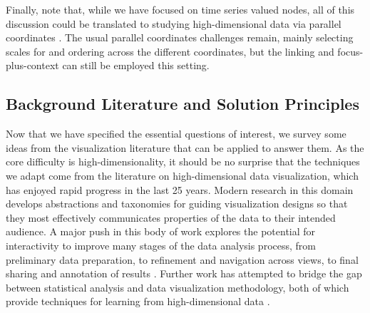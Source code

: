 Finally, note that, while we have focused on time series valued nodes,
all of this discussion could be translated to studying high-dimensional
data via parallel coordinates \citep{inselberg1991parallel}. The usual parallel
coordinates challenges remain, mainly selecting scales for and ordering
across the different coordinates, but the linking and focus-plus-context
can still be employed this setting.

\subsection{Background Literature and Solution Principles}
\label{background-literature-and-solution-principles}

Now that we have specified the essential questions of interest, we survey some
ideas from the visualization literature that can be applied to answer them. As
the core difficulty is high-dimensionality, it should be no surprise that the
techniques we adapt come from the literature on high-dimensional data
visualization, which has enjoyed rapid progress in the last 25 years. Modern
research in this domain develops abstractions and taxonomies for guiding
visualization designs so that they most effectively communicates properties of
the data to their intended audience. A major push in this body of work explores
the potential for interactivity to improve many stages of the data analysis
process, from preliminary data preparation, to refinement and navigation across
views, to final sharing and annotation of results \citep{heer2012taxonomy}.
Further work has attempted to bridge the gap between statistical analysis and
data visualization methodology, both of which provide techniques for learning
from high-dimensional data \citep{de2003visual}.

